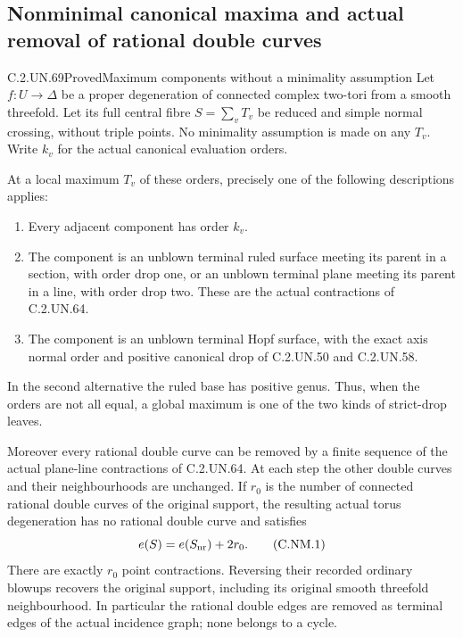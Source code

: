 \subsection{Nonminimal canonical maxima and actual removal of rational double curves}

\begin{statement}{C.2.UN.69}{Proved}{Maximum components without a minimality assumption}
Let $f:U\to\Delta$ be a proper degeneration of connected complex
two-tori from a smooth threefold. Let its full central fibre
$S=\sum_vT_v$ be reduced and simple normal crossing, without triple
points. No minimality assumption is made on any $T_v$.
Write $k_v$ for the actual canonical evaluation orders.

At a local maximum $T_v$ of these orders, precisely one of the
following descriptions applies:
\begin{enumerate}
\item Every adjacent component has order $k_v$.
\item The component is an unblown terminal ruled surface meeting
its parent in a section, with order drop one, or an unblown
terminal plane meeting its parent in a line, with order drop two.
These are the actual contractions of C.2.UN.64.
\item The component is an unblown terminal Hopf surface, with
the exact axis normal order and positive canonical drop of
C.2.UN.50 and C.2.UN.58.
\end{enumerate}
In the second alternative the ruled base has positive genus.
Thus, when the orders are not all equal, a global maximum is
one of the two kinds of strict-drop leaves.

Moreover every rational double curve can be removed by a finite
sequence of the actual plane-line contractions of C.2.UN.64.
At each step the other double curves and their neighbourhoods
are unchanged. If $r_0$ is the number of connected rational
double curves of the original support, the resulting actual
torus degeneration has no rational double curve and satisfies
\[
             e(S)=e(S_{\rm nr})+2r_0 .
\tag{C.NM.1}
\]
There are exactly $r_0$ point contractions. Reversing their
recorded ordinary blowups recovers the original support,
including its original smooth threefold neighbourhood.
In particular the rational double edges are removed as terminal
edges of the actual incidence graph; none belongs to a cycle.
\end{statement}

